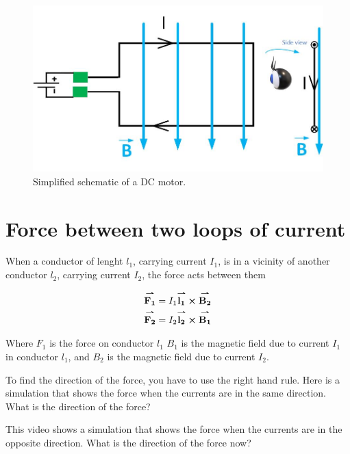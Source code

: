 \documentclass{ximera}
\begin{document}
\begin{figure}[htbp]
\begin{center}
\includegraphics[scale=0.5]{../jpg/dcMotor.jpg}
\end{center}
\caption{Simplified schematic of a DC motor. }
\label{fig:dcMotor}
\end{figure}

\section{Force between two loops of current}

When a conductor of lenght $l_1$, carrying current $I_1$, is in a vicinity of another conductor $l_2$, carrying current $I_2$, the force acts between them 


\begin{eqnarray}
{\overset{\boldsymbol{\rightharpoonup}}{\mathbf{F_1}}}\hspace{0in}=I_1 {\overset{\boldsymbol{\rightharpoonup}}{\mathbf{l_1}}}\hspace{0in} \boldsymbol\times {\overset{\boldsymbol{\rightharpoonup}}{\mathbf{B_2}}}\hspace{0in} \\
{\overset{\boldsymbol{\rightharpoonup}}{\mathbf{F_2}}}\hspace{0in}=I_2 {\overset{\boldsymbol{\rightharpoonup}}{\mathbf{l_2}}}\hspace{0in} \boldsymbol\times {\overset{\boldsymbol{\rightharpoonup}}{\mathbf{B_1}}}\hspace{0in}
\end{eqnarray}

Where $F_1$ is the force on conductor $l_1$ $B_1$ is the magnetic field due to current $I_1$ in conductor $l_1$, and $B_2$ is the magnetic field due to current $I_2$.

To find the direction of the force, you have to use the right hand rule. Here is a simulation that shows the force when the currents are in the same direction. What is the direction of the force?

\begin{center}  
\end{center} 

This video shows a simulation that shows the force when the currents are in the opposite direction. What is the direction of the force now?


\begin{center}  
\end{center} 
\end{document}
